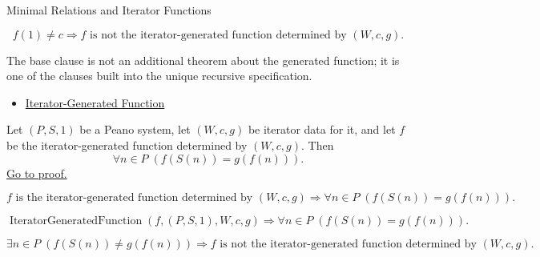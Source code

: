 \begin{topicbox}{Minimal Relations and Iterator Functions}
\begin{remark*}
\[
f(1)\neq c
\Longrightarrow
f \text{ is not the iterator-generated function determined by } (W,c,g).
\]
\end{remark*}

\begin{remark*}[Interpretation]
The base clause is not an additional theorem about the generated function; it
is one of the clauses built into the unique recursive specification.
\end{remark*}

\begin{remark*}[Dependencies]
\begin{itemize}
  \item \hyperref[def:iterator-generated-function]{Iterator-Generated Function}
\end{itemize}
\end{remark*}

\begin{tcolorbox}[colback=thmbox, colframe=thmborder, arc=2pt,
  left=6pt, right=6pt, top=4pt, bottom=4pt,
  title={\small\textbf{Theorem (Iterator Successor Clause)}},
  fonttitle=\small\bfseries]
\begin{theorem}
\label{thm:iterator-successor-step}
Let $(P,S,1)$ be a Peano system, let $(W,c,g)$ be iterator data for it, and let
$f$ be the iterator-generated function determined by $(W,c,g)$. Then
\[
\forall n\in P\;(f(S(n))=g(f(n))).
\]
\hyperref[prf:iterator-successor-step]{Go to proof.}
\end{theorem}
\end{tcolorbox}

\begin{remark*}
\[
f \text{ is the iterator-generated function determined by } (W,c,g)
\Longrightarrow
\forall n\in P\;(f(S(n))=g(f(n))).
\]
\end{remark*}

\begin{remark*}
\[
\operatorname{IteratorGeneratedFunction}(f,(P,S,1),W,c,g)
\Longrightarrow
\forall n\in P\;(f(S(n))=g(f(n))).
\]
\end{remark*}

\begin{remark*}
\[
\exists n\in P\;(f(S(n))\neq g(f(n)))
\Longrightarrow
f \text{ is not the iterator-generated function determined by } (W,c,g).
\]
\end{remark*}


\end{topicbox}
